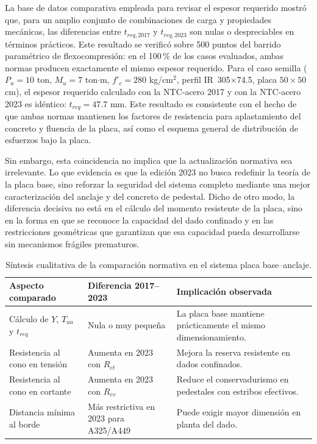 La base de datos comparativa empleada para revisar el espesor requerido mostró que, para un amplio
conjunto de combinaciones de carga y propiedades mecánicas, las diferencias entre $t_{req,2017}$ y
$t_{req,2023}$ son nulas o despreciables en términos prácticos. Este resultado se verificó sobre
500 puntos del barrido paramétrico de flexocompresión: en el 100\,\% de los casos evaluados, ambas
normas producen exactamente el mismo espesor requerido. Para el caso semilla
($P_u = 10$ ton, $M_u = 7$ ton$\cdot$m, $f'_c = 280$ kg/cm$^2$, perfil IR~305$\times$74.5,
placa $50\times50$ cm), el espesor requerido calculado con la NTC-acero 2017 y con la NTC-acero 2023
es idéntico: $t_{req} = 47.7$ mm. Este resultado es consistente con el hecho de que ambas normas
mantienen los factores de resistencia para aplastamiento del concreto y fluencia de la placa, así
como el esquema general de distribución de esfuerzos bajo la placa.

Sin embargo, esta coincidencia no implica que la actualización normativa sea irrelevante. Lo que
evidencia es que la edición 2023 no busca redefinir la teoría de la placa base, sino reforzar la
seguridad del sistema completo mediante una mejor caracterización del anclaje y del concreto de
pedestal. Dicho de otro modo, la diferencia decisiva no está en el cálculo del momento resistente
de la placa, sino en la forma en que se reconoce la capacidad del dado confinado y en las
restricciones geométricas que garantizan que esa capacidad pueda desarrollarse sin mecanismos
frágiles prematuros.

\begin{table}[H]
  \centering
  \caption{Síntesis cualitativa de la comparación normativa en el sistema placa base--anclaje.}
  \label{tab:sintesis_general_cap4}
  \begin{tabular}{p{}p{}p{}}
    \toprule
    Aspecto comparado & Diferencia 2017--2023 & Implicación observada \\
    \midrule
    Cálculo de $Y$, $T_{ua}$ y $t_{req}$ & Nula o muy pequeña & La placa base mantiene prácticamente el mismo dimensionamiento. \\
    Resistencia al cono en tensión & Aumenta en 2023 con $R_{et}$ & Mejora la reserva resistente en dados confinados. \\
    Resistencia al cono en cortante & Aumenta en 2023 con $R_{ev}$ & Reduce el conservadurismo en pedestales con estribos efectivos. \\
    Distancia mínima al borde & Más restrictiva en 2023 para A325/A449 & Puede exigir mayor dimensión en planta del dado. \\
    \bottomrule
  \end{tabular}
\end{table}

